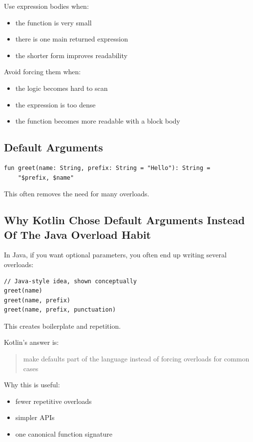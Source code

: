 \documentclass[11pt,a4paper]{article}
\begin{document}
Use expression bodies when:
\begin{itemize}
    \item the function is very small
    \item there is one main returned expression
    \item the shorter form improves readability
\end{itemize}

Avoid forcing them when:
\begin{itemize}
    \item the logic becomes hard to scan
    \item the expression is too dense
    \item the function becomes more readable with a block body
\end{itemize}

\subsection{Default Arguments}

\begin{lstlisting}[style=kazekotlin]
fun greet(name: String, prefix: String = "Hello"): String =
    "$prefix, $name"
\end{lstlisting}

This often removes the need for many overloads.

\subsection{Why Kotlin Chose Default Arguments Instead Of The Java Overload Habit}

In Java, if you want optional parameters, you often end up writing several overloads:

\begin{lstlisting}[style=kazekotlin]
// Java-style idea, shown conceptually
greet(name)
greet(name, prefix)
greet(name, prefix, punctuation)
\end{lstlisting}

This creates boilerplate and repetition.

Kotlin's answer is:
\begin{quote}
make defaults part of the language instead of forcing overloads for common cases
\end{quote}

Why this is useful:
\begin{itemize}
    \item fewer repetitive overloads
    \item simpler APIs
    \item one canonical function signature
\end{itemize}
\end{document}
